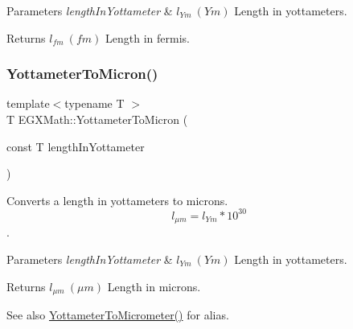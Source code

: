 \begin{DoxyParams}{Parameters}
{\em length\+In\+Yottameter} & $ l_{Ym}\ (Ym)$ Length in yottameters. \\
\hline
\end{DoxyParams}
\begin{DoxyReturn}{Returns}
$ l_{fm}\ (fm)$ Length in fermis. 
\end{DoxyReturn}
\mbox{\label{group___e_g_x_math-_conversions-_length_conversions-_s_i-_yottameter-_non-_s_i_gaad96d515763b1dfbcd968020e1b97de4}} 
\subsubsection{\texorpdfstring{Yottameter\+To\+Micron()}{YottameterToMicron()}}
{\footnotesize\ttfamily template$<$typename T $>$ \\
T E\+G\+X\+Math\+::\+Yottameter\+To\+Micron (\begin{DoxyParamCaption}\item[{const T}]{length\+In\+Yottameter }\end{DoxyParamCaption})}



Converts a length in yottameters to microns. \[ l_{\mu m}=l_{Ym} * 10^{30} \]. 


\begin{DoxyParams}{Parameters}
{\em length\+In\+Yottameter} & $ l_{Ym}\ (Ym)$ Length in yottameters. \\
\hline
\end{DoxyParams}
\begin{DoxyReturn}{Returns}
$ l_{\mu m}\ (\mu m)$ Length in microns. 
\end{DoxyReturn}
\begin{DoxySeeAlso}{See also}
\mbox{\hyperlink{group___e_g_x_math-_conversions-_length_conversions-_s_i-_yottameter-_s_i_ga25310d8ba2830f305680927ac3c13c38}{Yottameter\+To\+Micrometer()}} for alias. 
\end{DoxySeeAlso}
\mbox{\label{group___e_g_x_math-_conversions-_length_conversions-_s_i-_yottameter-_non-_s_i_ga545da9526f7a62f5ca7d1800faf17d1d}} 
